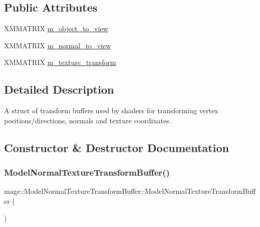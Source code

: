 \subsection*{Public Attributes}
\begin{DoxyCompactItemize}
\item 
X\+M\+M\+A\+T\+R\+IX \hyperlink{structmage_1_1_model_normal_texture_transform_buffer_ad7529c313b070994419a129476db4308}{m\+\_\+object\+\_\+to\+\_\+view}
\item 
X\+M\+M\+A\+T\+R\+IX \hyperlink{structmage_1_1_model_normal_texture_transform_buffer_a2e8950b98f36bd1ad6d5b35a8db298a9}{m\+\_\+normal\+\_\+to\+\_\+view}
\item 
X\+M\+M\+A\+T\+R\+IX \hyperlink{structmage_1_1_model_normal_texture_transform_buffer_a702a55ad742e74f29c57582dd2686864}{m\+\_\+texture\+\_\+transform}
\end{DoxyCompactItemize}


\subsection{Detailed Description}
A struct of transform buffers used by shaders for transforming vertex positions/directions, normals and texture coordinates. 

\subsection{Constructor \& Destructor Documentation}
\hypertarget{structmage_1_1_model_normal_texture_transform_buffer_ad419df3f0977a4d9185489c19e2237b6}{}\label{structmage_1_1_model_normal_texture_transform_buffer_ad419df3f0977a4d9185489c19e2237b6} 
\subsubsection{\texorpdfstring{Model\+Normal\+Texture\+Transform\+Buffer()}{ModelNormalTextureTransformBuffer()}\hspace{0.1cm}{\footnotesize\ttfamily [1/3]}}
{\footnotesize\ttfamily mage\+::\+Model\+Normal\+Texture\+Transform\+Buffer\+::\+Model\+Normal\+Texture\+Transform\+Buffer (\begin{DoxyParamCaption}{ }\end{DoxyParamCaption})}


